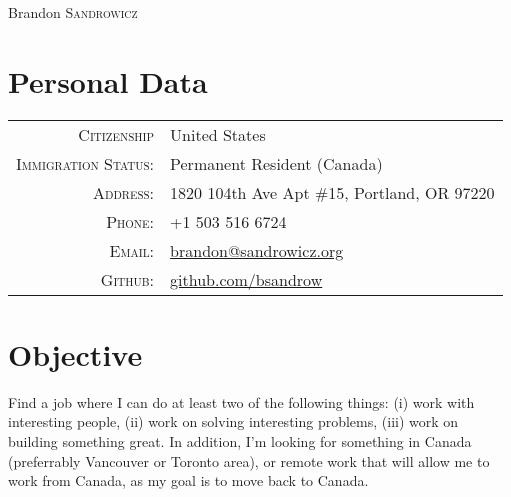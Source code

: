 \documentclass[a4paper,10pt]{article}
\begin{document}
\pagestyle{empty} %

\par{\centering
    {\Huge Brandon \textsc{Sandrowicz} }
    \bigskip\par}

\section{Personal Data}
\begin{tabular}{rl}
\textsc{Citizenship}                    & United States\\
\textsc{Immigration Status:}            & Permanent Resident (Canada)\\
\textsc{Address:}                       & 1820 104th Ave Apt \#15, Portland, OR 97220\\
\textsc{Phone:}                         & +1 503 516 6724\\
\textsc{Email:}                         & \href{mailto:brandon@sandrowicz.org}{brandon@sandrowicz.org}\\
\textsc{Github:}                        & \href{http://github.com/bsandrow}{github.com/bsandrow}\\
\end{tabular}

\section{Objective}
Find a job where I can do at least two of the following things: (i) work with
interesting people, (ii) work on solving interesting problems, (iii) work on
building something great. In addition, I'm looking for something in Canada
(preferrably Vancouver or Toronto area), or remote work that will allow me to
work from Canada, as my goal is to move back to Canada.

\end{document}
